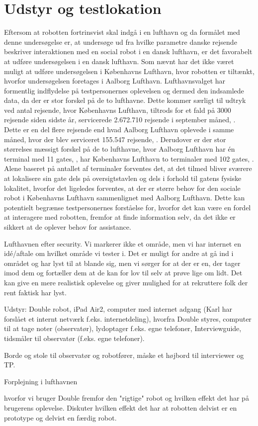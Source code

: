 \section{Udstyr og testlokation}
\label{UdstyrOgTestlokationValgAfGestikker}
%
Eftersom at robotten fortrinsvist skal indgå i en lufthavn og da formålet med denne undersøgelse er, at undersøge ud fra hvilke parametre danske rejsende beskriver interaktionen med en social robot i en dansk lufthavn, er det favorabelt at udføre undersøgelsen i en dansk lufthavn. Som nævnt har det ikke været muligt at udføre undersøgelsen i Københavns Lufthavn, hvor robotten er tiltænkt, hvorfor undersøgelsen foretages i Aalborg Lufthavn. Lufthavnsvalget har formentlig indflydelse på testpersonernes oplevelsen og dermed den indsamlede data, da der er stor forskel på de to lufthavne. Dette kommer særligt til udtryk ved antal rejsende, hvor Københavns Lufthavn, tiltrods for et fald på 3000 rejsende siden sidste år, servicerede 2.672.710 rejsende i september måned, \parencite{WEB:CPHStatistisk}. Dette er en del flere rejsende end hvad Aalborg Lufthavn oplevede i samme måned, hvor der blev serviceret 155.547 rejsende, \parencite{WEB:AALStatistik}. Derudover er der stor størrelses mæssigt forskel på de to lufthavne, hvor Aalborg Lufthavn har én terminal med 11 gates, \parencite{WEB:AALTerminalOversigt}, har Københavns Lufthavn to terminaler med 102 gates, \parencite{WEB:CPHTerminalOversigt}. Alene baseret på antallet af terminaler forventes det, at det tilmed bliver sværere at lokalisere sin gate dels på oversigtstavlen og dels i forhold til gatens fysiske lokalitet, hvorfor det ligeledes forventes, at der er større behov for den sociale robot i Københavns Lufthavn sammenlignet med Aalborg Lufthavn. Dette kan potentielt begrænse testpersonernes forståelse for, hvorfor det kan være en fordel at interagere med robotten, fremfor at finde information selv, da det ikke er sikkert at de oplever behov for assistance.      





Lufthavnen efter security. 
Vi markerer ikke et område, men vi har internet en idé/aftale om hvilket område vi tester i. Det er muligt for andre at gå ind i området og har lyst til at blande sig, men vi sørger for at der er en, der tager imod dem og fortæller dem at de kan for lov til selv at prøve lige om lidt. Det kan give en mere realistisk oplevelse og giver mulighed for at rekruttere folk der rent faktisk har lyst. 

Udstyr: Double robot, iPad Air2, computer med internet adgang (Karl har forslået et internt netværk f.eks. internetdeling), hvorfra Double styres, computer til at tage noter (observatør), lydoptager f.eks. egne telefoner, Interviewguide, tidsmåler til observatør (f.eks. egne telefoner). 

Borde og stole til observatør og robotfører, måske et højbord til interviewer og TP.   

Forplejning i lufthavnen



 hvorfor vi bruger Double fremfor den "rigtige" robot og hvilken effekt det har på brugerens oplevelse. Diskuter hvilken effekt det har at robotten delvist er en prototype og delvist en færdig robot.          

